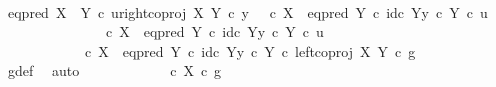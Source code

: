 \begin{isabellebody}
\ \ \ \ \isamarkupfalse%
\ {\isachardoublequoteopen}eq{\isacharunderscore}{\kern0pt}pred\ {\isacharparenleft}{\kern0pt}X\ {\isasymCoprod}\ Y{\isacharparenright}{\kern0pt}\ {\isasymcirc}\isactrlsub c\ {\isasymlangle}u{\isacharcomma}{\kern0pt}right{\isacharunderscore}{\kern0pt}coproj\ X\ Y\ {\isasymcirc}\isactrlsub c\ y{\isasymrangle}\ {\isacharequal}{\kern0pt}\ {\isacharparenleft}{\kern0pt}{\isasymf}\ {\isasymcirc}\isactrlsub c\ {\isasymbeta}\isactrlbsub X\isactrlesub {\isacharparenright}{\kern0pt}\ {\isasymamalg}\ {\isacharparenleft}{\kern0pt}eq{\isacharunderscore}{\kern0pt}pred\ Y\ {\isasymcirc}\isactrlsub c\ {\isasymlangle}id\isactrlsub c\ Y{\isacharcomma}{\kern0pt}y\ {\isasymcirc}\isactrlsub c\ {\isasymbeta}\isactrlbsub Y\isactrlesub {\isasymrangle}{\isacharparenright}{\kern0pt}\ {\isasymcirc}\isactrlsub c\ u{\isachardoublequoteclose}\isanewline
\ \ \ \ \isamarkupfalse%
\ {\isacharminus}{\kern0pt}\isanewline
\ \ \ \ \ \ \isamarkupfalse%
\ {\isachardoublequoteopen}{\isacharparenleft}{\kern0pt}{\isasymf}\ {\isasymcirc}\isactrlsub c\ {\isasymbeta}\isactrlbsub X\isactrlesub {\isacharparenright}{\kern0pt}\ {\isasymamalg}\ {\isacharparenleft}{\kern0pt}eq{\isacharunderscore}{\kern0pt}pred\ Y\ {\isasymcirc}\isactrlsub c\ {\isasymlangle}id\isactrlsub c\ Y{\isacharcomma}{\kern0pt}y\ {\isasymcirc}\isactrlsub c\ {\isasymbeta}\isactrlbsub Y\isactrlesub {\isasymrangle}{\isacharparenright}{\kern0pt}\ {\isasymcirc}\isactrlsub c\ u\isanewline
\ \ \ \ \ \ \ \ \ \ {\isacharequal}{\kern0pt}\ {\isacharparenleft}{\kern0pt}{\isasymf}\ {\isasymcirc}\isactrlsub c\ {\isasymbeta}\isactrlbsub X\isactrlesub {\isacharparenright}{\kern0pt}\ {\isasymamalg}\ {\isacharparenleft}{\kern0pt}eq{\isacharunderscore}{\kern0pt}pred\ Y\ {\isasymcirc}\isactrlsub c\ {\isasymlangle}id\isactrlsub c\ Y{\isacharcomma}{\kern0pt}y\ {\isasymcirc}\isactrlsub c\ {\isasymbeta}\isactrlbsub Y\isactrlesub {\isasymrangle}{\isacharparenright}{\kern0pt}\ {\isasymcirc}\isactrlsub c\ left{\isacharunderscore}{\kern0pt}coproj\ X\ Y\ {\isasymcirc}\isactrlsub c\ g{\isachardoublequoteclose}\isanewline
\ \ \ \ \ \ \ \ \isamarkupfalse%
\ g{\isacharunderscore}{\kern0pt}def\ \isamarkupfalse%
\ auto\isanewline
\ \ \ \ \ \ \isamarkupfalse%
\ \isamarkupfalse%
\ {\isachardoublequoteopen}{\isachardot}{\kern0pt}{\isachardot}{\kern0pt}{\isachardot}{\kern0pt}\ {\isacharequal}{\kern0pt}\ {\isacharparenleft}{\kern0pt}{\isasymf}\ {\isasymcirc}\isactrlsub c\ {\isasymbeta}\isactrlbsub X\isactrlesub {\isacharparenright}{\kern0pt}\ {\isasymcirc}\isactrlsub c\ g{\isachardoublequoteclose}\isanewline

\end{isabellebody}
